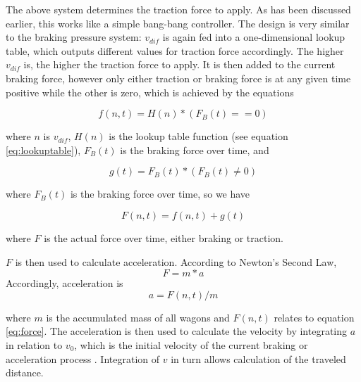\par\noindent
The above system determines the traction force to apply. As has been discussed earlier, this works like a simple bang-bang controller. The design is very similar to the braking pressure system: $v_{dif}$ is again fed into a one-dimensional lookup table, which outputs different values for traction force accordingly. The higher $v_{dif}$ is, the higher the traction force to apply. It is then added to the current braking force, however only either traction or braking force is at any given time positive while the other is zero, which is achieved by the equations
 
\begin{equation}
\label{eq:tracforce}
f(n,t) = H(n) * (F_{B}(t) == 0) 
\end{equation}

\noindent
where $n$ is $v_{dif}$, $H(n)$ is the lookup table function (see equation \ref{eq:lookuptable}), $F_{B}(t)$ is the braking force over time, and 

\begin{equation}
\label{eq:brakeforce}
g(t) = F_{B}(t) * (F_{B}(t) \neq 0)
\end{equation}

\noindent
where $F_{B}(t)$ is the braking force over time, so we have 

\begin{equation}
\label{eq:force}
F(n,t) = f(n,t) + g(t) 
\end{equation} 

\noindent
where $F$ is the actual force over time, either braking or traction.

\par\noindent
$F$ is then used to calculate acceleration. According to Newton's Second Law,
\begin{equation}
\label{eq:newton}
F = m * a
\end{equation}
Accordingly, acceleration is
\begin{equation}
\label{eq:acceleration}
a = F(n,t) / m
\end{equation}
	
\noindent
where $m$ is the accumulated mass of all wagons and $F(n,t)$ relates to equation \ref{eq:force}. The acceleration is then used to calculate the velocity by integrating $a$ in relation to $v_{0}$, which is the initial velocity of the current braking or acceleration process . Integration of $v$ in turn allows calculation of the traveled distance.

